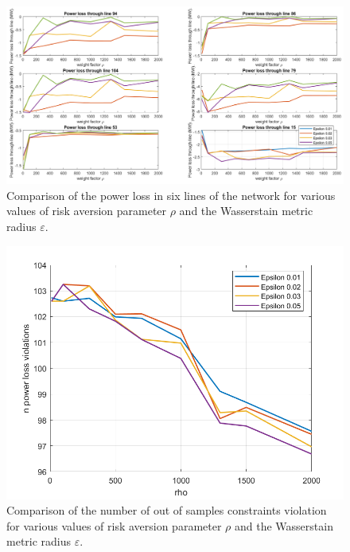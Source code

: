 \documentclass[11pt,a4paper,oneside,openany]{book}
\numberwithin{definition}{section}
\numberwithin{theorem}{section}
\numberwithin{problem}{section}
\begin{document}
\begin{adjustwidth}{-1.5cm}{-1.5cm}    
\begin{figure}[!ht]
    \centering
    \includegraphics[scale=0.29]{immagini/PowerLossLines.png}
    \caption{Comparison of the power loss in six lines of the network for various values of risk aversion parameter $\rho$ and the Wasserstain metric radius $\varepsilon$.}
    \label{PowerLossLines}
\end{figure}
\end{adjustwidth}

\begin{figure}[!ht]
    \centering
    \includegraphics[scale=0.5]{immagini/NPloss.png}
    \caption{Comparison of the number of out of samples constraints violation for various values of risk aversion parameter $\rho$ and the Wasserstain metric radius $\varepsilon$.}
    \label{NPloss}
\end{figure}
\end{document}
